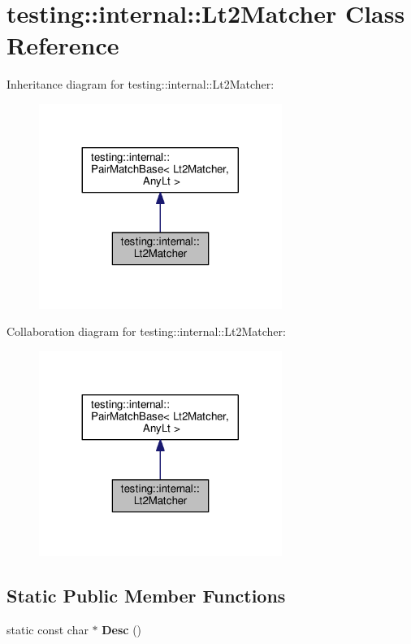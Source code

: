 \hypertarget{classtesting_1_1internal_1_1Lt2Matcher}{}\section{testing\+:\+:internal\+:\+:Lt2\+Matcher Class Reference}
\label{classtesting_1_1internal_1_1Lt2Matcher}


Inheritance diagram for testing\+:\+:internal\+:\+:Lt2\+Matcher\+:\nopagebreak
\begin{figure}[H]
\begin{center}
\leavevmode
\includegraphics[width=224pt]{classtesting_1_1internal_1_1Lt2Matcher__inherit__graph}
\end{center}
\end{figure}


Collaboration diagram for testing\+:\+:internal\+:\+:Lt2\+Matcher\+:\nopagebreak
\begin{figure}[H]
\begin{center}
\leavevmode
\includegraphics[width=224pt]{classtesting_1_1internal_1_1Lt2Matcher__coll__graph}
\end{center}
\end{figure}
\subsection*{Static Public Member Functions}
\begin{DoxyCompactItemize}
\item 
static const char $\ast$ {\bfseries Desc} ()\hypertarget{classtesting_1_1internal_1_1Lt2Matcher_ae5d3129050392105e21755f39b933b09}{}\label{classtesting_1_1internal_1_1Lt2Matcher_ae5d3129050392105e21755f39b933b09}

\end{DoxyCompactItemize}
